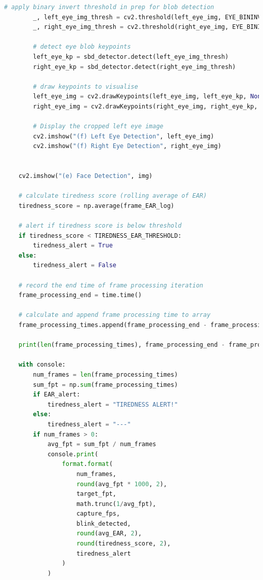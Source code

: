 \documentclass[10pt,conference]{IEEEtran}
\begin{document}
\begin{lstlisting}[language=Python,basicstyle=\tiny, showspaces=false, showstringspaces=false tabsize=1, breaklines=true]
        # apply binary invert threshold in prep for blob detection
        _, left_eye_img_thresh = cv2.threshold(left_eye_img, EYE_BININV_MIN_THRESHOLD, EYE_BININV_MAX_THRESHOLD, cv2.THRESH_BINARY_INV)
        _, right_eye_img_thresh = cv2.threshold(right_eye_img, EYE_BININV_MIN_THRESHOLD, EYE_BININV_MAX_THRESHOLD, cv2.THRESH_BINARY_INV)
        
        # detect eye blob keypoints
        left_eye_kp = sbd_detector.detect(left_eye_img_thresh)
        right_eye_kp = sbd_detector.detect(right_eye_img_thresh)

        # draw keypoints to visualise
        left_eye_img = cv2.drawKeypoints(left_eye_img, left_eye_kp, None, color=(0,0,255), flags=cv2.DRAW_MATCHES_FLAGS_DRAW_RICH_KEYPOINTS)
        right_eye_img = cv2.drawKeypoints(right_eye_img, right_eye_kp, None, color=(0,0,255), flags=cv2.DRAW_MATCHES_FLAGS_DRAW_RICH_KEYPOINTS)

        # Display the cropped left eye image
        cv2.imshow("(f) Left Eye Detection", left_eye_img)
        cv2.imshow("(f) Right Eye Detection", right_eye_img)


    cv2.imshow("(e) Face Detection", img)

    # calculate tiredness score (rolling average of EAR)
    tiredness_score = np.average(frame_EAR_log)

    # alert if tiredness score is below threshold
    if tiredness_score < TIREDNESS_EAR_THRESHOLD:
        tiredness_alert = True
    else:
        tiredness_alert = False

    # record the end time of frame processing iteration
    frame_processing_end = time.time()

    # calculate and append frame processing time to array
    frame_processing_times.append(frame_processing_end - frame_processing_start)

    print(len(frame_processing_times), frame_processing_end - frame_processing_start)

    with console:
        num_frames = len(frame_processing_times)
        sum_fpt = np.sum(frame_processing_times)
        if EAR_alert:
            tiredness_alert = "TIREDNESS ALERT!"
        else:
            tiredness_alert = "---"
        if num_frames > 0:
            avg_fpt = sum_fpt / num_frames
            console.print(
                format.format(
                    num_frames,
                    round(avg_fpt * 1000, 2),
                    target_fpt,
                    math.trunc(1/avg_fpt),
                    capture_fps,
                    blink_detected,
                    round(avg_EAR, 2),
                    round(tiredness_score, 2),
                    tiredness_alert
                )
            )


\end{lstlisting}
\end{document}
